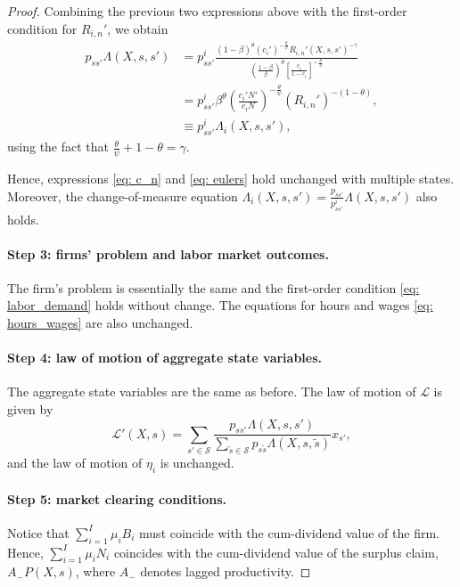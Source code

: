 \begin{proof}
Combining the previous two expressions above with the first-order condition for $R_{i,n}'$, we obtain
\begin{align}
    p_{ss'} \Lambda(X,s,s') &= p_{ss'}^i \frac{(1-\beta)^\theta (c_i')^{-\frac{\theta}{\psi}} R_{i,n}'(X,s,s')^{-\gamma}}{\left( \frac{1-\beta}{\beta} \right)^\theta \left[ \frac{c_i}{1-c_i} \right]^{-\frac{\theta}{\psi}}} \\
    &= p_{ss'}^i \beta^\theta \left( \frac{c_i' N'}{c_i N} \right)^{-\frac{\theta}{\psi}} (R_{i,n}')^{-(1-\theta)}, \\
    &\equiv p_{ss'}^i \Lambda_i(X,s,s'),
\end{align}
using the fact that $\frac{\theta}{\psi} + 1-\theta = \gamma$.

Hence, expressions \eqref{eq: c_n} and \eqref{eq: eulers} hold unchanged with multiple states. Moreover, the change-of-measure equation $\Lambda_i(X,s,s') = \frac{p_{ss'}}{p_{ss'}^i}\Lambda(X,s,s')$ also holds. 

\paragraph{Step 3: firms' problem and labor market outcomes.} 
The firm's problem is essentially the same and the first-order condition \eqref{eq: labor_demand} holds without change. 
The equations for hours and wages \eqref{eq: hours_wages} are also unchanged.

\paragraph{Step 4: law of motion of aggregate state variables.} The aggregate state variables are the same as before. The law of motion of $\mathcal{L}$ is given by
\begin{equation}
    \mathcal{L}'(X,s) = \sum_{s'\in \mathcal{S}} \frac{p_{ss'} \Lambda(X,s,s')}{\sum_{\tilde{s} \in \mathcal{S}} p_{s\tilde{s}} \Lambda(X,s,\tilde{s})} x_{s'},
\end{equation}
and the law of motion of $\eta_i$ is unchanged. 

\paragraph{Step 5: market clearing conditions.}
Notice that $\sum_{i=1}^I \mu_i B_{i}$ must coincide with the cum-dividend value of the firm. Hence, $\sum_{i=1}^I \mu_i N_{i}$ coincides with the cum-dividend value of the surplus claim, $A_{-} P(X,s)$, where $A_{-}$ denotes lagged productivity.


\end{proof}
